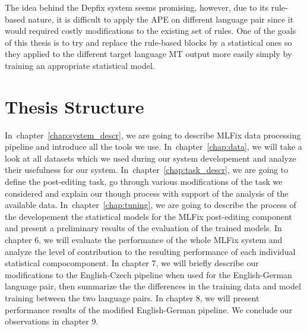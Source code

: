 The idea behind the Depfix system seems promising, however, due to its rule-based nature, it is difficult
to apply the APE on different language pair since it would required costly modifications to the
existing set of rules. One of the goals of this thesis is to try and replace the rule-based blocks
by a statistical ones so they applied to the different target language MT output more easily simply
by training an appropriate statistical model.


\section{Thesis Structure}

In~chapter~\ref{chap:system_descr}, we are going to describe MLFix data processing
pipeline and introduce all the tools we use.
In~chapter~\ref{chap:data}, we will take a look at all datasets which we used during our system
developement and analyze their usefulness for our system.
In~chapter~\ref{chap:task_descr}, we are going to define the post-editing task, go through
various modifications of the task we considered and explain our though
process with support of the analysis of the available data.
In~chapter~\ref{chap:tuning}, we are going to describe the process of the developement
the statistical models for the MLFix post-editing component and present
a preliminary results of the evaluation of the trained models.
In chapter 6, we will evaluate the performance of the whole MLFix system
and analyze the level of contribution to the resulting performance
of each individual statistical compocomponent.
In chapter 7, we will briefly describe our modifications to the English-Czech pipeline
when used for the English-German language pair, then summarize the the differences
in the training data and model training between the two language pairs.
In chapter 8, we will present performance results of the modified English-German
pipeline.
We conclude our observations in chapter 9.

